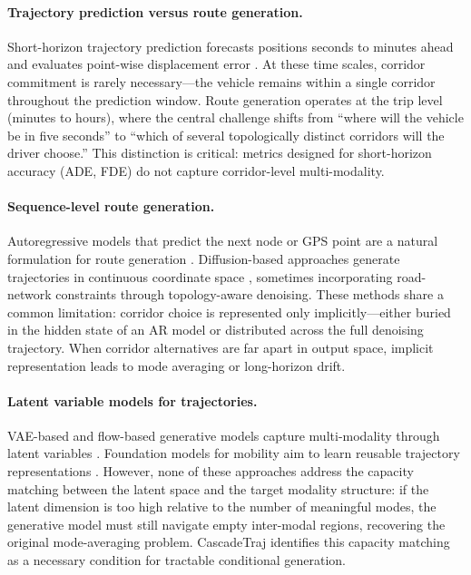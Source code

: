 
\paragraph{Trajectory prediction versus route generation.}
Short-horizon trajectory prediction forecasts positions seconds to minutes ahead and evaluates point-wise displacement error \citep{gupta2018social,salzmann2020trajectronpp,alahi2016social,zhou2022hivt}.
At these time scales, corridor commitment is rarely necessary---the vehicle remains within a single corridor throughout the prediction window.
Route generation operates at the trip level (minutes to hours), where the central challenge shifts from ``where will the vehicle be in five seconds'' to ``which of several topologically distinct corridors will the driver choose.''
This distinction is critical: metrics designed for short-horizon accuracy (ADE, FDE) do not capture corridor-level multi-modality.

\paragraph{Sequence-level route generation.}
Autoregressive models that predict the next node or GPS point are a natural formulation for route generation \citep{kong2023mobility_survey,hsu2024trajgpt}.
Diffusion-based approaches generate trajectories in continuous coordinate space \citep{zhu2023difftraj,wei2024diffrntraj,zhu2024controltraj,yang2025geo}, sometimes incorporating road-network constraints through topology-aware denoising.
These methods share a common limitation: corridor choice is represented only implicitly---either buried in the hidden state of an AR model or distributed across the full denoising trajectory.
When corridor alternatives are far apart in output space, implicit representation leads to mode averaging or long-horizon drift.

\paragraph{Latent variable models for trajectories.}
VAE-based and flow-based generative models capture multi-modality through latent variables \citep{kingma2014auto}.
Foundation models for mobility aim to learn reusable trajectory representations \citep{lin2024trajfm,unitraj2025,choudhury2024trajectorypowered,liu2025trajmamba}.
However, none of these approaches address the capacity matching between the latent space and the target modality structure: if the latent dimension is too high relative to the number of meaningful modes, the generative model must still navigate empty inter-modal regions, recovering the original mode-averaging problem.
CascadeTraj identifies this capacity matching as a necessary condition for tractable conditional generation.

